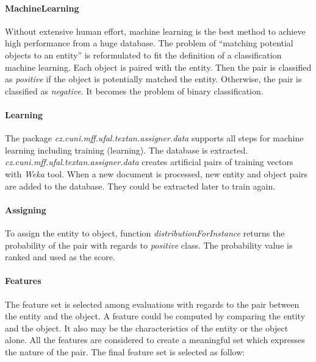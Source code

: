 \paragraph{MachineLearning}
Without extensive human effort, machine learning is the best method to achieve
high performance from a huge database. The problem of ``matching potential
objects to an entity'' is reformulated to fit the definition of a classification
machine learning. Each object is paired with the entity. Then the pair is
classified as \emph{positive} if the object is potentially matched the entity.
Otherwise, the pair is classified as \emph{negative}. It becomes the
problem of binary classification.


\paragraph{Learning}
The package \emph{cz.\-cuni.\-mff.\-ufal.\-textan.\-assigner.\-data} supports all steps for
machine learning including training (learning). The database is extracted. 
\emph{cz.\-cuni.\-mff.\-ufal.\-textan.\-assigner.\-data} creates artificial pairs of
training vectors with \textit{Weka} tool. When a new document is processed,
new entity and object pairs are added to the database. They could be extracted
later to train again.

\paragraph{Assigning}
To assign the entity to object, function \emph{distributionForInstance} returns
the probability of the pair with regards to \emph{positive} class. The
probability value is ranked and used as the score.

\paragraph{Features}

The feature set is selected among evaluations with regards to the pair between
the entity and the object. A feature could be computed by comparing the entity 
and the object. It also may be the characteristics of the entity or the object 
alone. All the features are considered to create a meaningful set which
expresses the nature of the pair. The final feature set is selected 
as follow:

